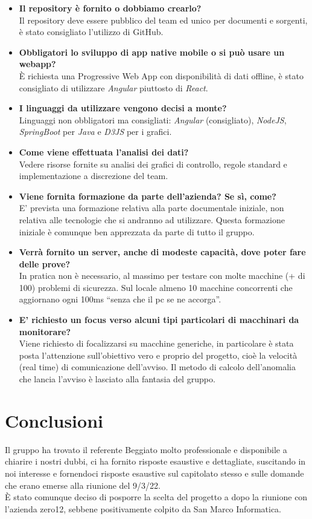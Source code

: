 \documentclass{classes/base}
\begin{document}
    \begin{itemize}
        \item  \textbf{Il repository è fornito o dobbiamo crearlo?}
        \\Il repository deve essere pubblico del team ed unico per documenti e sorgenti, è stato consigliato l'utilizzo di GitHub.
        \item  \textbf{Obbligatori lo sviluppo di app native mobile o si può usare un webapp?}
        \\È richiesta una Progressive Web App con disponibilità di dati offline, è stato consigliato di utilizzare \textit{Angular} piuttosto di \textit{React}.
        \item  \textbf{I linguaggi da utilizzare vengono decisi a monte?} 
        \\Linguaggi non obbligatori ma consigliati: \textit{Angular} (consigliato), \textit{NodeJS}, \textit{SpringBoot} per \textit{Java} e \textit{D3JS} per i grafici.
        \item  \textbf{Come viene effettuata l'analisi dei dati?}
        \\Vedere risorse fornite su analisi dei grafici di controllo, regole standard e implementazione a discrezione del team.
        \item  \textbf{Viene fornita formazione da parte dell'azienda? Se sì, come?}
        \\E’ prevista una formazione relativa alla parte documentale iniziale, non relativa alle tecnologie che si andranno ad utilizzare. Questa formazione iniziale è comunque ben apprezzata da parte di tutto il gruppo.
        \item  \textbf{Verrà fornito un server, anche di modeste capacità, dove poter fare delle prove?}
        \\In pratica non è necessario, al massimo per testare con molte macchine (+ di 100) problemi di sicurezza. Sul locale almeno 10 macchine concorrenti che aggiornano ogni 100ms “senza che il pc se ne accorga”.
        \item  \textbf{E' richiesto un focus verso alcuni tipi particolari di macchinari da monitorare?}
        \\Viene richiesto di focalizzarsi su macchine generiche, in particolare è stata posta l’attenzione sull’obiettivo vero e proprio del progetto, cioè la velocità (real time) di comunicazione dell’avviso. Il metodo di calcolo dell’anomalia che lancia l’avviso è lasciato alla fantasia del gruppo.
    \end{itemize}

    \section{Conclusioni}
    Il gruppo ha trovato il referente Beggiato molto professionale e disponibile a chiarire i nostri dubbi, ci ha fornito risposte esaustive e dettagliate, suscitando in noi interesse e fornendoci risposte esaustive sul capitolato stesso e sulle domande che erano emerse alla riunione del 9/3/22. 
    \\È stato comunque deciso di posporre la scelta del progetto a dopo la riunione con l'azienda zero12, sebbene positivamente colpito da San Marco Informatica.
\end{document}
